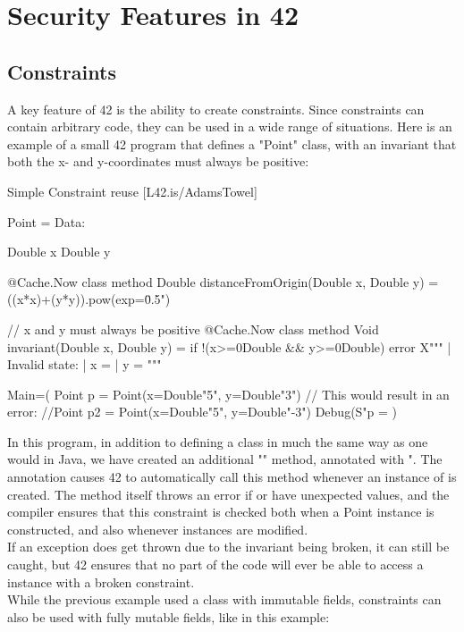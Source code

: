 \chapter{Security Features in 42}\label{C:sec}

\section{Constraints}

A key feature of 42 is the ability to create constraints. Since constraints can contain arbitrary code, they can be used in a wide range of situations. Here is an example of a small 42 program that defines a "Point" class, with an invariant that both the x- and y-coordinates must always be positive:

\begin{mylisting}{Simple Constraint}
reuse [L42.is/AdamsTowel]

Point = Data:{
  Double x
  Double y

  @Cache.Now
  class method Double distanceFromOrigin(Double x, Double y) = 
    ((x*x)+(y*y)).pow(exp=\"0.5")

  // x and y must always be positive
  @Cache.Now
  class method Void invariant(Double x, Double y) = 
    if !(x>=0Double && y>=0Double) error X"""%
      | Invalid state:
      | x = %
      | y = %
      """
  }

Main=(
  Point p = Point(x=Double"5", y=Double"3")
  // This would result in an error:
  //Point p2 = Point(x=Double"5", y=Double"-3")
  Debug(S"p = %
  )
\end{mylisting}

In this program, in addition to defining a  class in much the same way as one would in Java, we have created an additional "" method, annotated with ". The annotation causes 42 to automatically call this method whenever an instance of  is created. The method itself throws an error if  or  have unexpected values, and the compiler ensures that this constraint is checked both when a Point instance is constructed, and also whenever instances are modified.
\\[12pt]
If an exception does get thrown due to the invariant being broken, it can still be caught, but 42 ensures that no part of the code will ever be able to access a  instance with a broken constraint.
\\[12pt]
While the previous example used a  class with immutable fields, constraints can also be used with fully mutable fields, like in this example:

